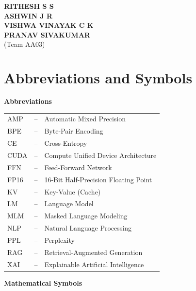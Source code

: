 \documentclass[a4paper, 12pt]{report}
\theoremstyle{definition}
\begin{document}
	\vspace{1.5cm}
	\begin{flushright}
		\textbf{RITHESH S S}\\
		\textbf{ASHWIN J R}\\
		\textbf{VISHWA VINAYAK C K}\\
		\textbf{PRANAV SIVAKUMAR}\\
		(Team AA03)
	\end{flushright}

	\clearpage
	\listoffigures
	
	\clearpage
	\listoftables

	\clearpage
\section*{{\huge Abbreviations and Symbols}\hfill} 
\vspace{0.4cm}

\noindent\textbf{\Large Abbreviations}
\vspace{0.2cm}

\noindent
\setlength{\tabcolsep}{5pt}
\begin{tabular}{p{2.5cm}cp{11.5cm}}
AMP &--& Automatic Mixed Precision \\
BPE &--& Byte-Pair Encoding \\
CE &--& Cross-Entropy \\
CUDA &--& Compute Unified Device Architecture \\
FFN &--& Feed-Forward Network \\
FP16 &--& 16-Bit Half-Precision Floating Point \\
KV &--& Key-Value (Cache) \\
LM &--& Language Model \\
MLM &--& Masked Language Modeling \\
NLP &--& Natural Language Processing \\
PPL &--& Perplexity \\
RAG &--& Retrieval-Augmented Generation \\
XAI &--& Explainable Artificial Intelligence \\
\end{tabular}

\vspace{0.6cm}
\noindent\textbf{\Large Mathematical Symbols}
\vspace{0.2cm}
\end{document}
